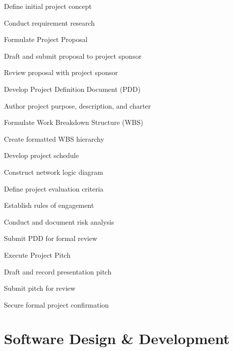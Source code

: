 \documentclass[11pt, a4paper]{report}
\begin{document}
\begin{wbs}
    \item Define initial project concept
    \item Conduct requirement research
    \item Formulate Project Proposal
    \begin{wbs}
        \item Draft and submit proposal to project sponsor
        \item Review proposal with project sponsor
    \end{wbs}
    \item Develop Project Definition Document (PDD)
    \begin{wbs}
        \item Author project purpose, description, and charter
        \item Formulate Work Breakdown Structure (WBS)
        \begin{wbs}
            \item Create formatted WBS hierarchy
        \end{wbs}
        \item Develop project schedule
        \begin{wbs}
            \item Construct network logic diagram
        \end{wbs}
        \item Define project evaluation criteria
        \item Establish rules of engagement
        \item Conduct and document risk analysis
        \item Submit PDD for formal review
    \end{wbs}
    \item Execute Project Pitch
    \begin{wbs}
        \item Draft and record presentation pitch
        \item Submit pitch for review
        \item Secure formal project confirmation
    \end{wbs}
\end{wbs}

\section{Software Design \& Development}
\end{document}
